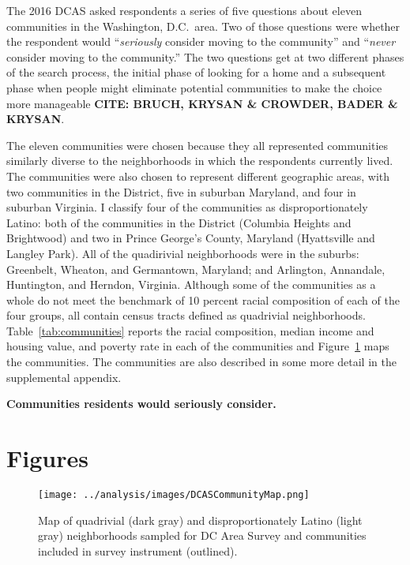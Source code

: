 \documentclass[11pt]{baderart}
\begin{document}
The 2016 DCAS asked respondents a series of five questions about eleven communities in the Washington, D.C.\ area. Two of those questions were whether the respondent would ``\emph{seriously} consider moving to the community'' and ``\emph{never} consider moving to the community.'' The two questions get at two different phases of the search process, the initial phase of looking for a home and a subsequent phase when people might eliminate potential communities to make the choice more manageable \textbf{CITE: BRUCH, KRYSAN \& CROWDER, BADER \& KRYSAN}. 

The eleven communities were chosen because they all represented communities similarly diverse to the neighborhoods in which the respondents currently lived. The communities were also chosen to represent different geographic areas, with two communities in the District, five in suburban Maryland, and four in suburban Virginia. I classify four of the communities as disproportionately Latino: both of the communities in the District (Columbia Heights and Brightwood) and two in Prince George's County, Maryland (Hyattsville and Langley Park). All of the quadirivial neighborhoods were in the suburbs: Greenbelt, Wheaton, and Germantown, Maryland; and Arlington, Annandale, Huntington, and Herndon, Virginia. Although some of the communities as a whole do not meet the benchmark of 10 percent racial composition of each of the four groups, all contain census tracts defined as quadrivial neighborhoods. Table~\ref{tab:communities} reports the racial composition, median income and housing value, and poverty rate in each of the communities and Figure~\ref{fig:map} maps the communities. The communities are also described in some more detail in the supplemental appendix. 



\textbf{Communities residents would seriously consider.} 





\clearpage



\clearpage
\section{Figures}
\begin{figure}
\texttt{[image: ../analysis/images/DCASCommunityMap.png]}
\caption{Map of quadrivial (dark gray) and disproportionately Latino (light gray) neighborhoods sampled for DC Area Survey and communities included in survey instrument (outlined).}
\label{fig:map}
\end{figure}
\end{document}
